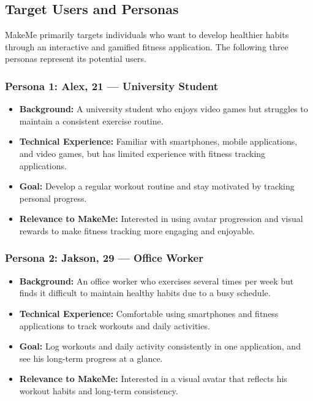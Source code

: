 \documentclass[11pt]{article}
\begin{document}
\subsection{Target Users and Personas}
MakeMe primarily targets individuals who want to develop healthier habits through an interactive and gamified fitness application. The following three personas represent its potential users.

\subsubsection*{Persona 1: Alex, 21 --- University Student}

\begin{itemize}
    \item \textbf{Background:}
    A university student who enjoys video games but struggles to maintain a consistent exercise routine.
    \item \textbf{Technical Experience:}
    Familiar with smartphones, mobile applications, and video games, but has limited experience with fitness tracking applications.
    \item \textbf{Goal:}
    Develop a regular workout routine and stay motivated by tracking personal progress.
    \item \textbf{Relevance to MakeMe:}
    Interested in using avatar progression and visual rewards to make fitness tracking more engaging and enjoyable.
\end{itemize}

\subsubsection*{Persona 2: Jakson, 29 --- Office Worker}

\begin{itemize}
    \item \textbf{Background:}
    An office worker who exercises several times per week but finds it difficult to maintain healthy habits due to a busy schedule.
    \item \textbf{Technical Experience:}
    Comfortable using smartphones and fitness applications to track workouts and daily activities.
    \item \textbf{Goal:}
    Log workouts and daily activity consistently in one application, and see his long-term progress at a glance.
    \item \textbf{Relevance to MakeMe:}
    Interested in a visual avatar that reflects his workout habits and long-term consistency.
\end{itemize}
\end{document}
